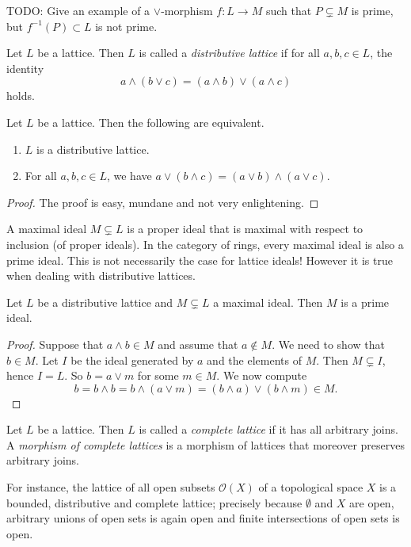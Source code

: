 \begin{example}
TODO: Give an example of a $\vee$-morphism $f : L \to M$ such that $P \subsetneq M$ is prime, but $f^{-1}(P) \subset L$ is not prime.
\end{example}

\begin{definition}
Let $L$ be a lattice. Then $L$ is called a \emph{distributive lattice} if for all $a,b,c \in L$, the identity
\[ a \wedge (b \vee c) = (a \wedge b) \vee (a \wedge c) \]
holds.
\end{definition}

\begin{lemma}
Let $L$ be a lattice. Then the following are equivalent.
\begin{enumerate}
	\item $L$ is a distributive lattice.
	\item For all $a,b,c \in L$, we have $a \vee (b \wedge c) = (a \vee b) \wedge (a \vee c)$.
\end{enumerate}
\end{lemma}
\begin{proof}
The proof is easy, mundane and not very enlightening.
\end{proof}
A maximal ideal $M \subsetneq L$ is a proper ideal that is maximal with respect to inclusion (of proper ideals). In the category of rings, every maximal ideal is also a prime ideal. This is not necessarily the case for lattice ideals! However it is true when dealing with distributive lattices.
\begin{proposition}
\label{distributive lattice maximal is prime}
Let $L$ be a distributive lattice and $M \subsetneq L$ a maximal ideal. Then $M$ is a prime ideal.
\end{proposition}
\begin{proof}
Suppose that $a \wedge b \in M$ and assume that $a \not\in M$. We need to show that $b \in M$. Let $I$ be the ideal generated by $a$ and the elements of $M$. Then $M \subsetneq I$, hence $I = L$. So $b = a \vee m$ for some $m \in M$. We now compute
\[ b = b \wedge b = b \wedge (a \vee m) = (b \wedge a) \vee (b \wedge m) \in M. \]
\end{proof}

\begin{definition}
Let $L$ be a lattice. Then $L$ is called a \emph{complete lattice} if it has all arbitrary joins. A \emph{morphism of complete lattices} is a morphism of lattices that moreover preserves arbitrary joins.
\end{definition}
For instance, the lattice of all open subsets $\mathcal{O}(X)$ of a topological space $X$ is a bounded, distributive and complete lattice; precisely because $\emptyset$ and $X$ are open, arbitrary unions of open sets is again open and finite intersections of open sets is open.

